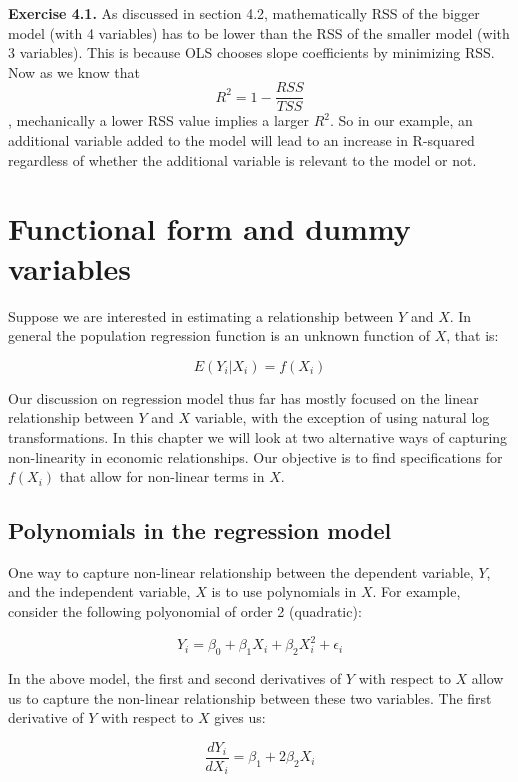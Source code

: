 \documentclass[
]{book}
\theoremstyle{definition}
\theoremstyle{definition}
\theoremstyle{definition}
\theoremstyle{definition}
\theoremstyle{remark}
\begin{document}
\textbf{Exercise 4.1.} As discussed in section 4.2, mathematically RSS of the bigger model (with 4 variables) has to be lower than the RSS of the smaller model (with 3 variables). This is because OLS chooses slope coefficients by minimizing RSS. Now as we know that \[R^2=1-\frac{RSS}{TSS}\], mechanically a lower RSS value implies a larger \(R^2\). So in our example, an additional variable added to the model will lead to an increase in R-squared regardless of whether the additional variable is relevant to the model or not.

\hypertarget{functional-form-and-dummy-variables}{%
\chapter{Functional form and dummy variables}\label{functional-form-and-dummy-variables}}

Suppose we are interested in estimating a relationship between \(Y\) and \(X\). In general the population regression function is an unknown function of \(X\), that is:

\[E(Y_i|X_i) = f(X_i)\]

Our discussion on regression model thus far has mostly focused on the linear relationship between \(Y\) and \(X\) variable, with the exception of using natural log transformations. In this chapter we will look at two alternative ways of capturing non-linearity in economic relationships. Our objective is to find specifications for \(f(X_i)\) that allow for non-linear terms in \(X\).

\hypertarget{polynomials-in-the-regression-model}{%
\section{Polynomials in the regression model}\label{polynomials-in-the-regression-model}}

One way to capture non-linear relationship between the dependent variable, \(Y\), and the independent variable, \(X\) is to use polynomials in \(X\). For example, consider the following polyonomial of order 2 (quadratic):

\[Y_i=\beta_0 +\beta_1 X_i + \beta_2 X_i^2+\epsilon_i\]

In the above model, the first and second derivatives of \(Y\) with respect to \(X\) allow us to capture the non-linear relationship between these two variables. The first derivative of \(Y\) with respect to \(X\) gives us:

\[\frac{dY_i}{dX_i}=\beta_1 + 2 \beta_2 X_i\]
\end{document}
